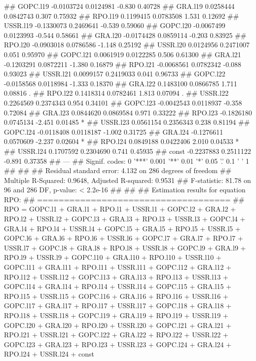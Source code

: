 \documentclass[
]{article}
\begin{document}
\begin{itemize}
## GOPC.l19 -0.0103724  0.0124981  -0.830  0.40728    
## GRA.l19   0.0258444  0.0842743   0.307  0.75932    
## RPO.l19   0.1199415  0.0783508   1.531  0.12692    
## USSR.l19 -0.1330073  0.2469641  -0.539  0.59060    
## GOPC.l20 -0.0067499  0.0123993  -0.544  0.58661    
## GRA.l20  -0.0174428  0.0859114  -0.203  0.83925    
## RPO.l20  -0.0903018  0.0786586  -1.148  0.25192    
## USSR.l20  0.0124956  0.2471007   0.051  0.95970    
## GOPC.l21  0.0061919  0.0122285   0.506  0.61300    
## GRA.l21  -0.1203291  0.0872211  -1.380  0.16879    
## RPO.l21  -0.0068561  0.0782342  -0.088  0.93023    
## USSR.l21  0.0099157  0.2419033   0.041  0.96733    
## GOPC.l22 -0.0158568  0.0118984  -1.333  0.18370    
## GRA.l22   0.1483100  0.0866785   1.711  0.08816 .  
## RPO.l22   0.1418314  0.0782461   1.813  0.07094 .  
## USSR.l22  0.2264569  0.2374343   0.954  0.34101    
## GOPC.l23 -0.0042543  0.0118937  -0.358  0.72084    
## GRA.l23   0.0844620  0.0869584   0.971  0.33222    
## RPO.l23  -0.1826180  0.0745134  -2.451  0.01485 *  
## USSR.l23  0.0561154  0.2356343   0.238  0.81194    
## GOPC.l24 -0.0118408  0.0118187  -1.002  0.31725    
## GRA.l24  -0.1276611  0.0570609  -2.237  0.02604 *  
## RPO.l24   0.0849188  0.0422406   2.010  0.04533 *  
## USSR.l24  0.1707592  0.2304690   0.741  0.45935    
## const    -0.2237883  0.2511122  -0.891  0.37358    
## ---
## Signif. codes:  0 '***' 0.001 '**' 0.01 '*' 0.05 '.' 0.1 ' ' 1
## 
## 
## Residual standard error: 4.132 on 286 degrees of freedom
## Multiple R-Squared: 0.9648,  Adjusted R-squared: 0.9531 
## F-statistic: 81.78 on 96 and 286 DF,  p-value: < 2.2e-16 
## 
## 
## Estimation results for equation RPO: 
## ==================================== 
## RPO = GOPC.l1 + GRA.l1 + RPO.l1 + USSR.l1 + GOPC.l2 + GRA.l2 + RPO.l2 + USSR.l2 + GOPC.l3 + GRA.l3 + RPO.l3 + USSR.l3 + GOPC.l4 + GRA.l4 + RPO.l4 + USSR.l4 + GOPC.l5 + GRA.l5 + RPO.l5 + USSR.l5 + GOPC.l6 + GRA.l6 + RPO.l6 + USSR.l6 + GOPC.l7 + GRA.l7 + RPO.l7 + USSR.l7 + GOPC.l8 + GRA.l8 + RPO.l8 + USSR.l8 + GOPC.l9 + GRA.l9 + RPO.l9 + USSR.l9 + GOPC.l10 + GRA.l10 + RPO.l10 + USSR.l10 + GOPC.l11 + GRA.l11 + RPO.l11 + USSR.l11 + GOPC.l12 + GRA.l12 + RPO.l12 + USSR.l12 + GOPC.l13 + GRA.l13 + RPO.l13 + USSR.l13 + GOPC.l14 + GRA.l14 + RPO.l14 + USSR.l14 + GOPC.l15 + GRA.l15 + RPO.l15 + USSR.l15 + GOPC.l16 + GRA.l16 + RPO.l16 + USSR.l16 + GOPC.l17 + GRA.l17 + RPO.l17 + USSR.l17 + GOPC.l18 + GRA.l18 + RPO.l18 + USSR.l18 + GOPC.l19 + GRA.l19 + RPO.l19 + USSR.l19 + GOPC.l20 + GRA.l20 + RPO.l20 + USSR.l20 + GOPC.l21 + GRA.l21 + RPO.l21 + USSR.l21 + GOPC.l22 + GRA.l22 + RPO.l22 + USSR.l22 + GOPC.l23 + GRA.l23 + RPO.l23 + USSR.l23 + GOPC.l24 + GRA.l24 + RPO.l24 + USSR.l24 + const 

\end{itemize}
\end{document}
